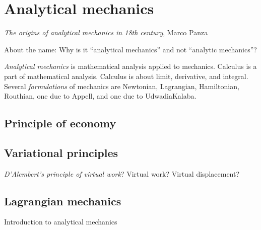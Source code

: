 \chapter{Analytical mechanics}

\emph{The origins of analytical mechanics in 18th century}, Marco Panza
\cite{panza2003origins}

About the name:
Why is it ``analytical mechanics'' and not ``analytic mechanics''?

\emph{Analytical mechanics} is mathematical analysis applied to mechanics.
Calculus is a part of mathematical analysis.
Calculus is about limit, derivative, and integral.
Several \emph{formulations} of mechanics are
Newtonian, Lagrangian, Hamiltonian, Routhian,
one due to Appell,
and one due to Udwadia\textendash{}Kalaba.


\section{Principle of economy}

\section{Variational principles}

\emph{D'Alembert's principle of virtual work}?
Virtual work?
Virtual displacement?

\section{Lagrangian mechanics}

Introduction to analytical mechanics \cite[p.~43]{varvoglis2014history}


